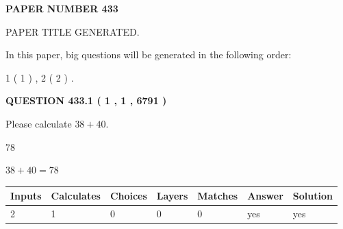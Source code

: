 \documentclass[12pt]{article}
\begin{document}
   
 {\textbf{ \Large{ PAPER NUMBER  433  }}}
   
   
\vspace{0.2in}
   
   
   
   
   
   
   
   
 \vspace{0.2in}
 
 
 
 
   
   
 PAPER TITLE GENERATED.
   
   
   
\vspace{0.2in}
   
In this paper, big questions will be generated in the following order: 
   
   
   1 ( 1 )
 ,
   2 ( 2 )
 .
  
\vspace{0.2in}
  
{\textbf{\Large{QUESTION
433.1 
 ( 1 , 1 , 6791 )
}}}
  
  
 
Please calculate $ %
38 +  %
40 $.
 
 
 
\noindent{}
 
 

78
 
 
\noindent{}
 
 

 
 
 
\noindent{}
 
 

$ %
38 +  %
40=   %
78$
 
 
\noindent{}
 
 

 
   
   
   
   
\noindent\begin{tabular}{|l|l|l|l|l|l|l|}
 \hline
Inputs & Calculates & Choices & Layers & Matches & Answer & Solution \\ \hline
 2  & 
 1  & 
 0
  & 
 0  & 
 0  & 
  yes & 
  yes 
  \\ \hline
 \end{tabular}
   
\end{document}
